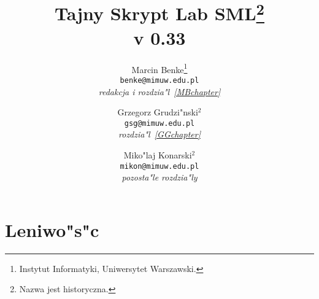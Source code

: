 \documentclass[a4paper]{report}
\begin{document}
\author{Marcin Benke\thanks{
   Instytut Informatyki, 
   Uniwersytet Warszawski.}
\\{\tt benke@mimuw.edu.pl}\\\emph{redakcja i rozdzia"l~\ref{MBchapter}} 
\and
Grzegorz Grudzi"nski$^2$\\{\tt gsg@mimuw.edu.pl}\\\emph{rozdzia"l~\ref{GGchapter}}
\and
Miko"laj Konarski$^2$\\{\tt mikon@mimuw.edu.pl}\\\emph{pozosta"le rozdzia"ly}}


\title{Tajny Skrypt Lab SML\thanks{Nazwa jest historyczna.}\\v 0.33}


\maketitle

\tableofcontents


 

\label{lab:list}





\label{MBchapter}
\chapter{
Leniwo"s"c}
\label{GGchapter}


\appendix



\end{document}

